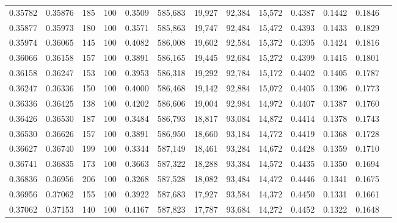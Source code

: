 \begin{tabular}{rrrrrrrrrrrrr}
0.35782 & 0.35876 &   185 & 100 &                                     0.3509 & 585,683 &  19,927 &  92,384 &  15,572 & 0.4387 & 0.1442 & 0.1846 \\
0.35877 & 0.35973 &   180 & 100 &                                     0.3571 & 585,863 &  19,747 &  92,484 &  15,472 & 0.4393 & 0.1433 & 0.1829 \\
0.35974 & 0.36065 &   145 & 100 &                                     0.4082 & 586,008 &  19,602 &  92,584 &  15,372 & 0.4395 & 0.1424 & 0.1816 \\
0.36066 & 0.36158 &   157 & 100 &                                     0.3891 & 586,165 &  19,445 &  92,684 &  15,272 & 0.4399 & 0.1415 & 0.1801 \\
0.36158 & 0.36247 &   153 & 100 &                                     0.3953 & 586,318 &  19,292 &  92,784 &  15,172 & 0.4402 & 0.1405 & 0.1787 \\
0.36247 & 0.36336 &   150 & 100 &                                     0.4000 & 586,468 &  19,142 &  92,884 &  15,072 & 0.4405 & 0.1396 & 0.1773 \\
0.36336 & 0.36425 &   138 & 100 &                                     0.4202 & 586,606 &  19,004 &  92,984 &  14,972 & 0.4407 & 0.1387 & 0.1760 \\
0.36426 & 0.36530 &   187 & 100 &                                     0.3484 & 586,793 &  18,817 &  93,084 &  14,872 & 0.4414 & 0.1378 & 0.1743 \\
0.36530 & 0.36626 &   157 & 100 &                                     0.3891 & 586,950 &  18,660 &  93,184 &  14,772 & 0.4419 & 0.1368 & 0.1728 \\
0.36627 & 0.36740 &   199 & 100 &                                     0.3344 & 587,149 &  18,461 &  93,284 &  14,672 & 0.4428 & 0.1359 & 0.1710 \\
0.36741 & 0.36835 &   173 & 100 &                                     0.3663 & 587,322 &  18,288 &  93,384 &  14,572 & 0.4435 & 0.1350 & 0.1694 \\
0.36836 & 0.36956 &   206 & 100 &                                     0.3268 & 587,528 &  18,082 &  93,484 &  14,472 & 0.4446 & 0.1341 & 0.1675 \\
0.36956 & 0.37062 &   155 & 100 &                                     0.3922 & 587,683 &  17,927 &  93,584 &  14,372 & 0.4450 & 0.1331 & 0.1661 \\
0.37062 & 0.37153 &   140 & 100 &                                     0.4167 & 587,823 &  17,787 &  93,684 &  14,272 & 0.4452 & 0.1322 & 0.1648 \\

\end{tabular}
